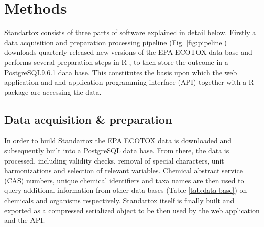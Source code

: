 
\section*{Methods}


Standartox consists of three parts of software explained in detail below. Firstly a data acquisition and preparation processing pipeline (Fig. \ref{fig:pipeline}) downloads quarterly released new versions of the EPA ECOTOX data base and performs several preparation steps in R \citep{rcoreteam_language_2017}, to then store the outcome in a PostgreSQL9.6.1 data base. This constitutes the basis upon which the web application and and application programming interface (API) together with a R package are accessing the data. 

\subsection*{Data acquisition \& preparation}

In order to build Standartox the EPA ECOTOX data is downloaded and subsequently built into a PostgreSQL data base. From there, the data is processed, including validity checks, removal of special characters, unit harmonizations and selection of relevant variables. Chemical abstract service (CAS) numbers, unique chemical identifiers and taxa names are then used to query additional information from other data bases (Table \ref{tab:data-base}) on chemicals and organisms respectively. Standartox itself is finally built and exported as a compressed serialized object to be then used by the web application and the API.

